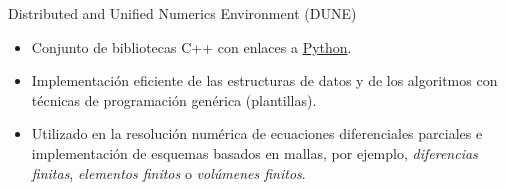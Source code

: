 \begin{frame}
\begin{alertblock}{Distributed and Unified Numerics Environment (DUNE)}
\begin{itemize}
			\item

			      Conjunto de bibliotecas \alert{C++} con enlaces a
			      \href{https://pypi.org/search/?q=dune-}{\alert{Python}}.


			\item

			      Implementación eficiente de las estructuras de
			      datos y de los algoritmos con técnicas de
			      programación genérica (plantillas).

			\item

			      Utilizado en la resolución numérica de
			      \alert{ecuaciones diferenciales parciales} e
			      implementación de esquemas basados en mallas, por
			      ejemplo, \emph{diferencias finitas},
			      \emph{elementos finitos} o
			      \emph{volúmenes finitos}.
		\end{itemize}
	\end{alertblock}


\end{frame}
